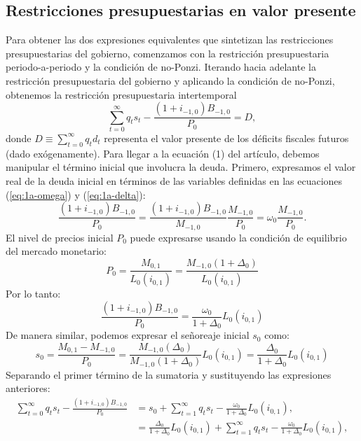 \documentclass[../../entrega.tex]{subfiles}
\begin{document}
\subsection{Restricciones presupuestarias en valor presente}
Para obtener las dos expresiones equivalentes que sintetizan las restricciones presupuestarias del gobierno, comenzamos con la restricción presupuestaria periodo-a-periodo y la condición de no-Ponzi.
Iterando hacia adelante la restricción presupuestaria del gobierno y aplicando la condición de no-Ponzi, obtenemos la restricción presupuestaria intertemporal
\begin{equation}
    \sum_{t=0}^{\infty} q_t s_t - \frac{(1 + i_{-1,0})B_{-1,0}}{P_0} = D,
\end{equation}
donde $D \equiv \sum_{t=0}^{\infty} q_t d_t$ representa el valor presente de los déficits fiscales futuros (dado exógenamente).
Para llegar a la ecuación (1) del artículo, debemos manipular el término inicial que involucra la deuda. Primero, expresamos el valor real de la deuda inicial en términos de las variables definidas en las ecuaciones (\ref{eq:1a-omega}) y (\ref{eq:1a-delta}):
\begin{equation}
    \frac{(1 + i_{-1,0})B_{-1,0}}{P_0} = \frac{(1 + i_{-1,0})B_{-1,0}}{M_{-1,0}} \frac{M_{-1,0}}{P_0} = \omega_0 \frac{M_{-1,0}}{P_0}.
\end{equation}
El nivel de precios inicial $P_0$ puede expresarse usando la condición de equilibrio del mercado monetario:
\begin{equation}
    P_0 = \frac{M_{0,1}}{L_0(i_{0,1})} = \frac{M_{-1,0}(1 + \Delta_0)}{L_0(i_{0,1})}
\end{equation}
Por lo tanto:
\begin{equation}
    \frac{(1 + i_{-1,0})B_{-1,0}}{P_0} = \frac{\omega_0}{1 + \Delta_0}L_0(i_{0,1})
\end{equation}
De manera similar, podemos expresar el señoreaje inicial $s_0$ como:
\begin{equation}
    s_0 = \frac{M_{0,1} - M_{-1,0}}{P_0} = \frac{M_{-1,0}(\Delta_0)}{M_{-1,0}(1 + \Delta_0)}L_0(i_{0,1}) = \frac{\Delta_0}{1 + \Delta_0}L_0(i_{0,1})
\end{equation}
Separando el primer término de la sumatoria y sustituyendo las expresiones anteriores:
\begin{align*}
    \sum_{t=0}^{\infty} q_t s_t - \frac{(1 + i_{-1,0})B_{-1,0}}{P_0} & = s_0 + \sum_{t=1}^{\infty} q_t s_t - \frac{\omega_0}{1 + \Delta_0}L_0(i_{0,1}),                                       \\
                                                                     & = \frac{\Delta_0}{1 + \Delta_0}L_0(i_{0,1}) + \sum_{t=1}^{\infty} q_t s_t - \frac{\omega_0}{1 + \Delta_0}L_0(i_{0,1}), \\
\end{align*}
\end{document}
